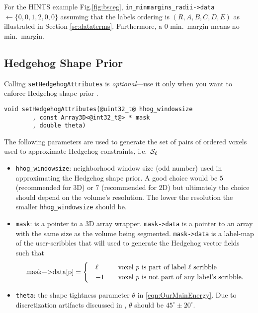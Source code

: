 \documentclass[12pt,letterpaper]{article}
\begin{document}
For the HINTS example Fig.\ref{fig:bsceg}, \lstinline[mathescape=true]{in_minmargins_radii->data} $\gets \{0,0,1,2,0,0\}$ assuming that the labels ordering is $(R,A,B,C,D,E)$ as illustrated in Section \ref{sc:dataterms}. Furthermore, a 0 min.~margin means no min.~margin.

\subsection{Hedgehog Shape Prior}
\label{sc:hhog}
Calling \lstinline{setHedgehogAttributes} is {\em optional}---use it only when you want to enforce Hedgehog shape prior \cite{hedgehogIsack}.
\begin{lstlisting}
void setHedgehogAttributes(@uint32_t@ hhog_windowsize
		, const Array3D<@int32_t@> * mask
		, double theta)
\end{lstlisting}
The following parameters are used to generate the set of pairs of ordered voxels used to approximate Hedgehog constraints, i.e.~${\cal S}_\ell$
\begin{itemize}
\item \lstinline{hhog_windowsize}: neighborhood window size (odd number) used in approximating the Hedgehog shape prior. A good choice would be $5$ (recommended for 3D) or $7$ (recommended for 2D) but ultimately the choice should depend on the volume's resolution. The lower the resolution the smaller \lstinline{hhog_windowsize} should be.
\item \lstinline{mask}: is a pointer to a 3D array wrapper. \lstinline{mask->data} is a pointer to an array with the same size as the volume being segmented.
    \lstinline{mask->data} is a label-map of the user-scribbles that will used to generate the Hedgehog vector fields such that\\
     \begin{equation*}
     \text{\lstinline{mask->data[p]}}=
     \begin{cases}
     \quad \ell &\quad \text{voxel $p$ is part of label $\ell$ scribble}\\
     \quad -1  & \quad\text{voxel $p$ is not part of any label's scribble.}
     \end{cases}
     \end{equation*}
\item \lstinline{theta}: the shape tightness parameter $\theta$ in \eqref{eqn:OurMainEnergy}. Due to discretization artifacts discussed in \cite{pathmovesTR2017}, $\theta$ should be $45^{\circ}\pm20^{\circ}.$
\end{itemize}
\end{document}
